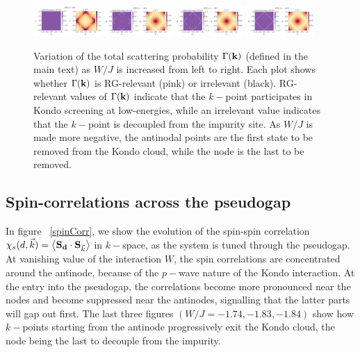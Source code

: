 \documentclass[reprint,hidelinks,onecolumn]{revtex4-2}
\begin{document}
\begin{figure}[!htpb]
	\centering
	\includegraphics[width=0.23\textwidth]{scattProb-1.pdf}
	\includegraphics[width=0.23\textwidth]{scattProb-3.pdf}
	\includegraphics[width=0.23\textwidth]{scattProb-4.pdf}
	\includegraphics[width=0.23\textwidth]{scattProb-5.pdf}
	\caption{Variation of the total scattering probability \(\Gamma({\bf k})\) (defined in the main text) as \(W/J\) is increased from left to right. Each plot shows whether \(\Gamma({\bf k})\) is RG-relevant (pink) or irrelevant (black). RG-relevant values of \(\Gamma({\bf k})\) indicate that the \(k-\)point participates in Kondo screening at low-energies, while an irrelevant value indicates that the \(k-\)point is decoupled from the impurity site. As \(W/J\) is made more negative, the antinodal points are the first state to be removed from the Kondo cloud, while the node is the last to be removed.}
	\label{gamma_kxky}
\end{figure}

\subsection{Spin-correlations across the pseudogap}
In figure ~\ref{spinCorr}, we show the evolution of the spin-spin correlation \(\chi_s(d,\vec k) = \left<{\bf S_d}\cdot{\bf S}_{\vec k}\right>\) in \(k-\)space, as the system is tuned through the pseudogap. At vanishing value of the interaction \(W\), the spin correlations are concentrated around the antinode, because of the \(p-\)wave nature of the Kondo interaction. At the entry into the pseudogap, the correlations become more pronounced near the nodes and become suppressed near the antinodes, signalling that the latter parts will gap out first. The last three figures \((W/J=-1.74, -1.83, -1.84)\) show how \(k-\)points starting from the antinode progressively exit the Kondo cloud, the node being the last to decouple from the impurity.
\end{document}
